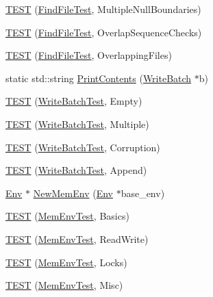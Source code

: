 \begin{DoxyCompactItemize}
\item 
\hyperlink{namespaceleveldb_ac9911f7a50cf3a0d5ddc4533910054a1}{T\+E\+S\+T} (\hyperlink{classleveldb_1_1_find_file_test}{Find\+File\+Test}, Multiple\+Null\+Boundaries)
\item 
\hyperlink{namespaceleveldb_a22fa4bca5e930976bcd623786011a180}{T\+E\+S\+T} (\hyperlink{classleveldb_1_1_find_file_test}{Find\+File\+Test}, Overlap\+Sequence\+Checks)
\item 
\hyperlink{namespaceleveldb_a60968bf0debd7046229d2da8d0a823c3}{T\+E\+S\+T} (\hyperlink{classleveldb_1_1_find_file_test}{Find\+File\+Test}, Overlapping\+Files)
\item 
static std\+::string \hyperlink{namespaceleveldb_a188b9c5674c8e10ff619f01f454faaf6}{Print\+Contents} (\hyperlink{classleveldb_1_1_write_batch}{Write\+Batch} $\ast$b)
\item 
\hyperlink{namespaceleveldb_a77a1389346b24fa9b5f9698400c865f6}{T\+E\+S\+T} (\hyperlink{classleveldb_1_1_write_batch_test}{Write\+Batch\+Test}, Empty)
\item 
\hyperlink{namespaceleveldb_af2029a94a0a17d6eb1bfec4d38b7e3a0}{T\+E\+S\+T} (\hyperlink{classleveldb_1_1_write_batch_test}{Write\+Batch\+Test}, Multiple)
\item 
\hyperlink{namespaceleveldb_a8021231dcd7fd48d082ecf965a2b8230}{T\+E\+S\+T} (\hyperlink{classleveldb_1_1_write_batch_test}{Write\+Batch\+Test}, Corruption)
\item 
\hyperlink{namespaceleveldb_a6b1521832d07ed987bc4ea6c3867bd00}{T\+E\+S\+T} (\hyperlink{classleveldb_1_1_write_batch_test}{Write\+Batch\+Test}, Append)
\item 
\hyperlink{classleveldb_1_1_env}{Env} $\ast$ \hyperlink{namespaceleveldb_a15271a802c68de223ea56b4b26e83519}{New\+Mem\+Env} (\hyperlink{classleveldb_1_1_env}{Env} $\ast$base\+\_\+env)
\item 
\hyperlink{namespaceleveldb_a0bec4396e504d47207110edc4a11f302}{T\+E\+S\+T} (\hyperlink{classleveldb_1_1_mem_env_test}{Mem\+Env\+Test}, Basics)
\item 
\hyperlink{namespaceleveldb_aaee612d19267a7183555aee571cd1415}{T\+E\+S\+T} (\hyperlink{classleveldb_1_1_mem_env_test}{Mem\+Env\+Test}, Read\+Write)
\item 
\hyperlink{namespaceleveldb_ab388329216765ab6e37e34b4ac778991}{T\+E\+S\+T} (\hyperlink{classleveldb_1_1_mem_env_test}{Mem\+Env\+Test}, Locks)
\item 
\hyperlink{namespaceleveldb_a57beb72845ed55c4cc316709f14670da}{T\+E\+S\+T} (\hyperlink{classleveldb_1_1_mem_env_test}{Mem\+Env\+Test}, Misc)

\end{DoxyCompactItemize}
